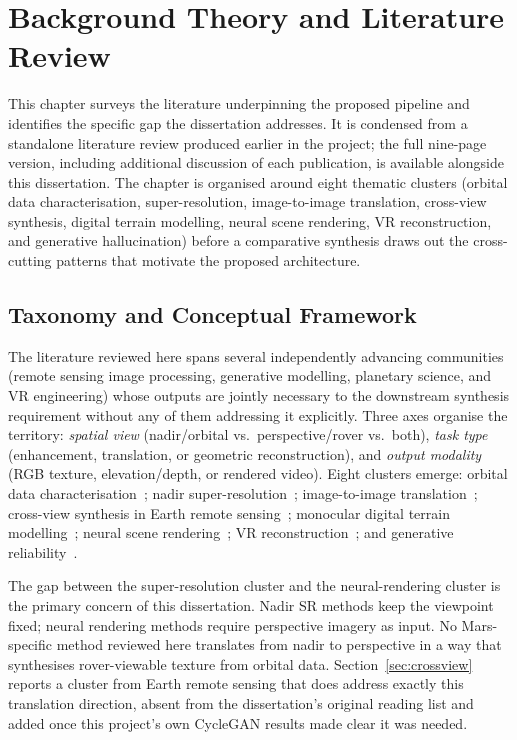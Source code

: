 \chapter{Background Theory and Literature Review}
\label{ch:litreview}

This chapter surveys the literature underpinning the proposed pipeline and identifies the specific gap the dissertation addresses. It is condensed from a standalone literature review produced earlier in the project; the full nine-page version, including additional discussion of each publication, is available alongside this dissertation. The chapter is organised around eight thematic clusters (orbital data characterisation, super-resolution, image-to-image translation, cross-view synthesis, digital terrain modelling, neural scene rendering, VR reconstruction, and generative hallucination) before a comparative synthesis draws out the cross-cutting patterns that motivate the proposed architecture.

\section{Taxonomy and Conceptual Framework}

The literature reviewed here spans several independently advancing communities (remote sensing image processing, generative modelling, planetary science, and VR engineering) whose outputs are jointly necessary to the downstream synthesis requirement without any of them addressing it explicitly. Three axes organise the territory: \textit{spatial view} (nadir/orbital vs.\ perspective/rover vs.\ both), \textit{task type} (enhancement, translation, or geometric reconstruction), and \textit{output modality} (RGB texture, elevation/depth, or rendered video). Eight clusters emerge: orbital data characterisation~\cite{serrano2013hirise,osadnik2025mcted}; nadir super-resolution~\cite{tao2021cassis,wu2024rstsrn,lu2025thermal,khanna2024diffusionsat,zhu2025taming}; image-to-image translation~\cite{kim2024unsb,xiao2025brownian}; cross-view synthesis in Earth remote sensing~\cite{qian2023sat2density,li2024sat2scene,li2024crossviewdiff}; monocular digital terrain modelling~\cite{tao2021madnet,zou2026pfmgan,cao2024gen3d}; neural scene rendering~\cite{giusti2022marf,li2025martian,dealmeida2025neural3d,martinezpetersen2025hifi,paul2025nerfspace}; VR reconstruction~\cite{catalano2025inpainting,li2025martian}; and generative reliability~\cite{aithal2024hallucination,rathkopf2025reliability}.

The gap between the super-resolution cluster and the neural-rendering cluster is the primary concern of this dissertation. Nadir SR methods keep the viewpoint fixed; neural rendering methods require perspective imagery as input. No Mars-specific method reviewed here translates from nadir to perspective in a way that synthesises rover-viewable texture from orbital data. Section~\ref{sec:crossview} reports a cluster from Earth remote sensing that does address exactly this translation direction, absent from the dissertation's original reading list and added once this project's own CycleGAN results made clear it was needed.

